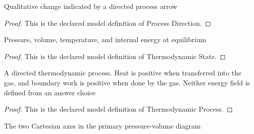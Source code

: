 \begin{definition}
  \label{def:physics:phyx-mini-0412:phyxminiproblems-problemphyxmini0412-processdirection}
  Qualitative change indicated by a directed process arrow
\end{definition}
\begin{proof}
  This is the declared model definition of Process Direction.
\end{proof}
\begin{definition}
  \label{def:physics:phyx-mini-0412:phyxminiproblems-problemphyxmini0412-thermodynamicstate}
  Pressure, volume, temperature, and internal energy at equilibrium
\end{definition}
\begin{proof}
  This is the declared model definition of Thermodynamic State.
\end{proof}
\begin{definition}
  \label{def:physics:phyx-mini-0412:phyxminiproblems-problemphyxmini0412-thermodynamicprocess}
  A directed thermodynamic process. Heat is positive when transferred into the gas, and boundary work is positive when done by the gas. Neither energy field is defined from an answer choice
\end{definition}
\begin{proof}
  This is the declared model definition of Thermodynamic Process.
\end{proof}
\begin{definition}
  \label{def:physics:phyx-mini-0412:phyxminiproblems-problemphyxmini0412-figureaxis}
  The two Cartesian axes in the primary pressure-volume diagram
\end{definition}
